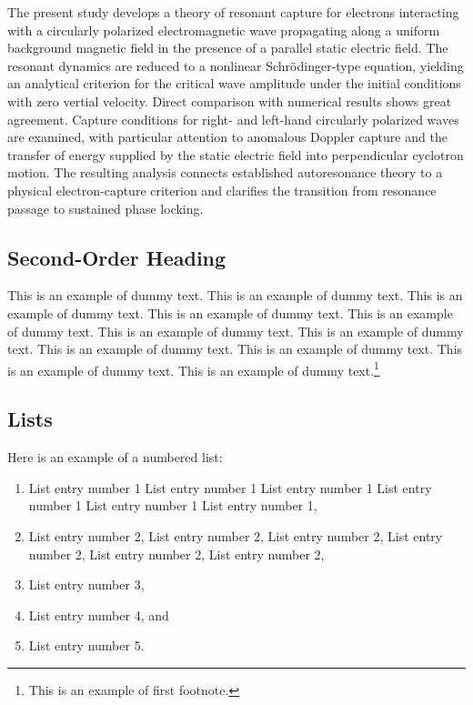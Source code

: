 \documentclass{jpp}
\begin{document}
The present study develops a theory of resonant capture for electrons interacting with a circularly polarized electromagnetic wave propagating along a uniform background magnetic field in the presence of a parallel static electric field. The resonant dynamics are reduced to a nonlinear Schr\"odinger-type equation, yielding an analytical criterion for the critical wave amplitude under the initial conditions with zero vertial velocity. Direct comparison with numerical results shows great agreement. Capture conditions for right- and left-hand circularly polarized waves are examined, with particular attention to anomalous Doppler capture and the transfer of energy supplied by the static electric field into perpendicular cyclotron motion. The resulting analysis connects established autoresonance theory to a physical electron-capture criterion and clarifies the transition from resonance passage to sustained phase locking.


\subsection{Second-Order Heading}

This is an example of dummy text. This is an example of dummy text. This is an example
of dummy text. This is an example of dummy text. This is an example of dummy text. This
is an example of dummy text. This is an example of dummy text. This is an example of
dummy text. This is an example of dummy text. This is an example of dummy text. This is
an example of dummy text.\footnote{This is an example of first footnote.}

\subsection{Lists}

Here is an example of a numbered list:

\begin{enumerate}
\item[1.] List entry number 1 List entry number 1 List entry number 1 List entry number 1 List
entry number 1 List entry number 1,
\item[2.] List entry number 2, List entry number 2, List entry number 2, List entry number 2, List
entry number 2, List entry number 2,
\item[3.] List entry number 3,
\item[4.] List entry number 4, and
\item[5.] List entry number 5.
\end{enumerate}
\end{document}
